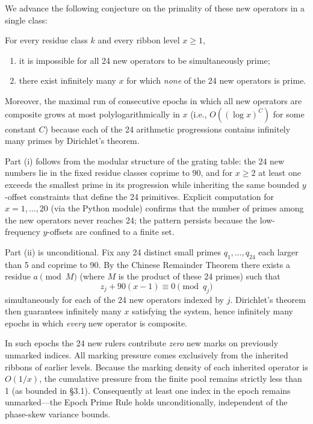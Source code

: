 \documentclass[11pt,a4paper]{article}
\begin{document}
{We advance the following conjecture on the primality of these new operators in a single class:

\begin{conjecture}
For every residue class \(k\) and every ribbon level \(x\geq1\),
\begin{enumerate}
\item[(i)] it is impossible for all 24 new operators to be simultaneously prime;
\item[(ii)] there exist infinitely many \(x\) for which \emph{none} of the 24 new operators is prime.
\end{enumerate}
Moreover, the maximal run of consecutive epochs in which all new operators are composite grows at most polylogarithmically in \(x\) (i.e., \(O((\log x)^C)\) for some constant \(C\)) because each of the 24 arithmetic progressions contains infinitely many primes by Dirichlet’s theorem.
\end{conjecture}

Part (i) follows from the modular structure of the grating table: the 24 new numbers lie in the fixed residue classes coprime to 90, and for \(x\geq2\) at least one exceeds the smallest prime in its progression while inheriting the same bounded \(y\)-offset constraints that define the 24 primitives. Explicit computation for \(x=1,\dots,20\) (via the Python module) confirms that the number of primes among the new operators never reaches 24; the pattern persists because the low-frequency \(y\)-offsets are confined to a finite set.

Part (ii) is unconditional. Fix any 24 distinct small primes \(q_1,\dots,q_{24}\) each larger than 5 and coprime to 90. By the Chinese Remainder Theorem there exists a residue \(a\pmod{M}\) (where \(M\) is the product of these 24 primes) such that
\[
z_j + 90(x-1) \equiv 0 \pmod{q_j}
\]
simultaneously for each of the 24 new operators indexed by \(j\). Dirichlet’s theorem then guarantees infinitely many \(x\) satisfying the system, hence infinitely many epochs in which \emph{every} new operator is composite.

In such epochs the 24 new rulers contribute \emph{zero} new marks on previously unmarked indices. All marking pressure comes exclusively from the inherited ribbons of earlier levels. Because the marking density of each inherited operator is \(O(1/x)\), the cumulative pressure from the finite pool remains strictly less than 1 (as bounded in §3.1). Consequently at least one index in the epoch remains unmarked—the Epoch Prime Rule holds unconditionally, independent of the phase-skew variance bounds.

}
\end{document}
